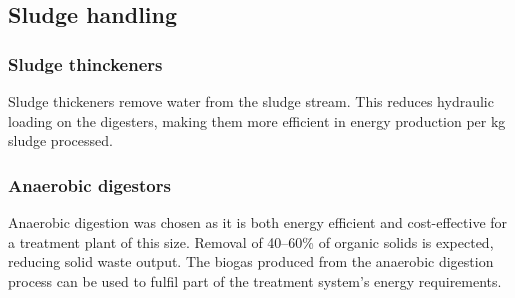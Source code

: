 \documentclass[a4paper,10pt]{article}
\begin{document}
\subsection{Sludge handling}
\subsubsection{Sludge thinckeners}
Sludge thickeners remove water from the sludge stream. This reduces hydraulic loading on the digesters, making them more efficient in energy production per kg sludge processed.

\subsubsection{Anaerobic digestors}
Anaerobic digestion was chosen as it is both energy efficient and cost-effective for a treatment plant of this size. Removal of 40--60\% of organic solids is expected, reducing solid waste output. The biogas produced from the anaerobic digestion process can be used to fulfil part of the treatment system's energy requirements.



\end{document}
